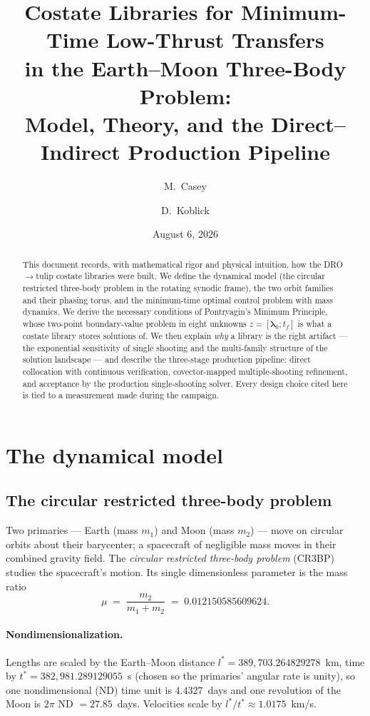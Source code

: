 \documentclass[11pt]{article}
\title{Costate Libraries for Minimum-Time Low-Thrust Transfers\\
in the Earth--Moon Three-Body Problem:\\
\large Model, Theory, and the Direct--Indirect Production Pipeline}
\author{M.~Casey \and D.~Koblick}
\date{August 6, 2026}
\begin{document}
\maketitle

\begin{abstract}
This document records, with mathematical rigor and physical intuition, how
the DRO$\to$tulip costate libraries were built. We define the dynamical
model (the circular restricted three-body problem in the rotating synodic
frame), the two orbit families and their phasing torus, and the minimum-time
optimal control problem with mass dynamics. We derive the necessary
conditions of Pontryagin's Minimum Principle, whose two-point boundary-value
problem in eight unknowns $z = [\bm\lambda_0; t_f]$ is what a costate
library stores solutions of. We then explain \emph{why} a library is the
right artifact --- the exponential sensitivity of single shooting and the
multi-family structure of the solution landscape --- and describe the
three-stage production pipeline: direct collocation with continuous
verification, covector-mapped multiple-shooting refinement, and acceptance
by the production single-shooting solver. Every design choice cited here is
tied to a measurement made during the campaign.
\end{abstract}

\tableofcontents

\section{The dynamical model}

\subsection{The circular restricted three-body problem}

Two primaries --- Earth (mass $m_1$) and Moon (mass $m_2$) --- move on
circular orbits about their barycenter; a spacecraft of negligible mass
moves in their combined gravity field. The \emph{circular restricted
three-body problem} (CR3BP) studies the spacecraft's motion. Its single
dimensionless parameter is the mass ratio
\begin{equation}
\mu \;=\; \frac{m_2}{m_1+m_2} \;=\; 0.012150585609624 .
\end{equation}

\paragraph{Nondimensionalization.} Lengths are scaled by the Earth--Moon
distance $l^\ast = 389{,}703.264829278$~km, time by
$t^\ast = 382{,}981.289129055$~s (chosen so the primaries' angular rate is
unity), so one nondimensional (ND) time unit is $4.4327$~days and one
revolution of the Moon is $2\pi$ ND $= 27.85$~days. Velocities scale by
$l^\ast/t^\ast \approx 1.0175$~km/s.
\end{document}
